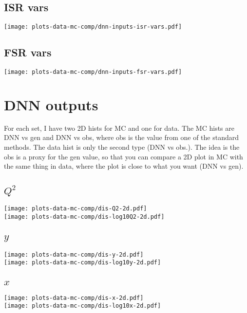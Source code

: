 \documentclass[11pt]{article}
\begin{document}
\subsection{ ISR vars }
\texttt{[image: plots-data-mc-comp/dnn-inputs-isr-vars.pdf]}

\subsection{ FSR vars }
\texttt{[image: plots-data-mc-comp/dnn-inputs-fsr-vars.pdf]}


\pagebreak

\section{ DNN outputs }

For each set, I have two 2D hists for MC and one for data.
The MC hists are DNN vs gen and DNN vs obs, where obs is
the value from one of the standard methods.  The data
hist is only the second type (DNN vs obs.).
The idea is the obs is a proxy for the gen value, so that you can
compare a 2D plot in MC with the same thing in data, where
the plot is close to what you want (DNN vs gen).

\subsection{ $Q^2$ }
\texttt{[image: plots-data-mc-comp/dis-Q2-2d.pdf]} \\
\texttt{[image: plots-data-mc-comp/dis-log10Q2-2d.pdf]}

\subsection{ $y$ }
\texttt{[image: plots-data-mc-comp/dis-y-2d.pdf]} \\
\texttt{[image: plots-data-mc-comp/dis-log10y-2d.pdf]}

\subsection{ $x$ }
\texttt{[image: plots-data-mc-comp/dis-x-2d.pdf]} \\
\texttt{[image: plots-data-mc-comp/dis-log10x-2d.pdf]}
\end{document}
